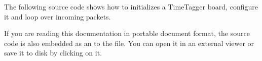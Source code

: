 	The following source code shows how to initializes a TimeTagger board, configure it and loop over incoming packets.

	If you are reading this documentation in portable document format, the source code is also embedded as an
	to the file. You can open it in an external viewer or save it to disk by clicking on it.

	